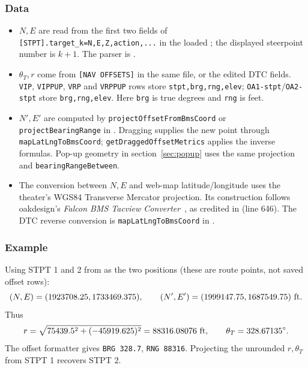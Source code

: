 \documentclass[10pt,a4paper]{amsart}
\begin{document}
\subsubsection*{Data}
\begin{itemize}
\setlength{\itemsep}{0pt}
\setlength{\parsep}{0pt}
\item $N,E$ are read from the first two fields of
\texttt{[STPT].target\_k=N,E,Z,action,...} in the loaded
; the displayed steerpoint number is $k+1$.
The parser is .
\item $\theta_T,r$ come from \texttt{[NAV OFFSETS]} in the same file,
or the edited DTC fields. \texttt{VIP}, \texttt{VIPPUP}, \texttt{VRP}
and \texttt{VRPPUP} rows store \texttt{stpt,brg,rng,elev};
\texttt{OA1-stpt}/\texttt{OA2-stpt} store \texttt{brg,rng,elev}.
Here \texttt{brg} is true degrees and \texttt{rng} is feet.
\item $N',E'$ are computed by \texttt{projectOffsetFromBmsCoord}
or \texttt{projectBearingRange} in .
Dragging supplies the new point through \texttt{mapLatLngToBmsCoord};
\texttt{getDraggedOffsetMetrics} applies the inverse formulas.
Pop-up geometry in section~\ref{sec:popup} uses the same projection
and \texttt{bearingRangeBetween}.
\item The conversion between $N,E$ and web-map latitude/longitude
uses the theater's WGS84 Transverse Mercator projection. Its construction
follows oakdesign's \emph{Falcon BMS Tacview Converter}~\cite{oakdesign_converter},
as credited in  (line 646). The DTC reverse
conversion is \texttt{mapLatLngToBmsCoord} in .
\end{itemize}

\subsubsection*{Example}
Using STPT 1 and 2 from  as the two
positions (these are route points, not saved offset rows):
\[
 (N,E)=(1923708.25,1733469.375),\qquad
 (N',E')=(1999147.75,1687549.75)\ {\rm ft}.
\]
Thus
\[
 r=\sqrt{75439.5^2+(-45919.625)^2}=88316.08076\ {\rm ft},\qquad
 \theta_T=328.67135^\circ.
\]
The offset formatter gives \texttt{BRG 328.7}, \texttt{RNG 88316}.
Projecting the unrounded $r,\theta_T$ from STPT 1 recovers STPT 2.
\end{document}
